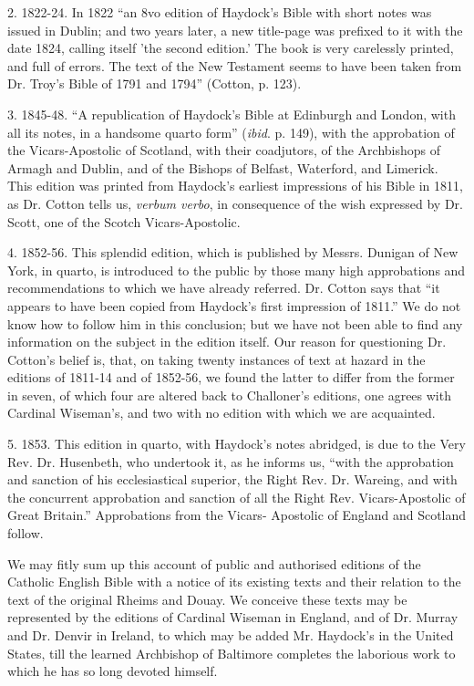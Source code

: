 2. 1822-24. In 1822 ``an 8vo edition of Haydock's Bible with
short notes was issued in Dublin; and two years later, a new
title-page was prefixed to it with the date 1824, calling itself 'the
second edition.' The book is very carelessly printed, and full of
errors. The text of the New Testament seems to have been taken from
Dr. Troy's Bible of 1791 and 1794'' (Cotton, p. 123).

3. 1845-48. ``A republication of Haydock's Bible at Edinburgh
and London, with all its notes, in a handsome quarto form'' (\emph{ibid}.
p. 149), with the approbation of the Vicars-Apostolic of Scotland,
with their coadjutors, of the Archbishops of Armagh and Dublin, and of
the Bishops of Belfast, Waterford, and Limerick. This edition was
printed from Haydock's earliest impressions of his Bible in 1811, as
Dr. Cotton tells us, \emph{verbum verbo}, in consequence of the wish
expressed by Dr. Scott, one of the Scotch Vicars-Apostolic.

4. 1852-56. This splendid edition, which is published by Messrs.
Dunigan of New York, in quarto, is introduced to the public by those
many high approbations and recommendations to which we have already
referred. Dr. Cotton says that ``it appears to have been copied
from Haydock's first impression of 1811.'' We do not know how to
follow him in this conclusion; but we have not been able to find any
information on the subject in the edition itself. Our reason for
questioning Dr. Cotton's belief is, that, on taking twenty instances
of text at hazard in the editions of 1811-14 and of 1852-56, we found
the latter to differ from the former in seven, of which four are
altered back to Challoner's editions, one agrees with Cardinal Wiseman's,
and two with no edition with which we are acquainted.

5. 1853. This edition in quarto, with Haydock's notes abridged, is
due to the Very Rev. Dr. Husenbeth, who undertook it, as he informs
us, ``with the approbation and sanction of his ecclesiastical
superior, the Right Rev. Dr. Wareing, and with the concurrent
approbation and sanction of all the Right Rev. Vicars-Apostolic of
Great Britain.'' Approbations from the Vicars- Apostolic of
England and Scotland follow.


We may fitly sum up this account of public and authorised editions
of the Catholic English Bible with a notice of its existing texts and
their relation to the text of the original Rheims and Douay. We
conceive these texts may be represented by the editions of Cardinal
Wiseman in England, and of Dr. Murray and Dr. Denvir in Ireland, to
which may be added Mr. Haydock's in the United States, till the
learned Archbishop of Baltimore completes the laborious work to which
he has so long devoted himself.

